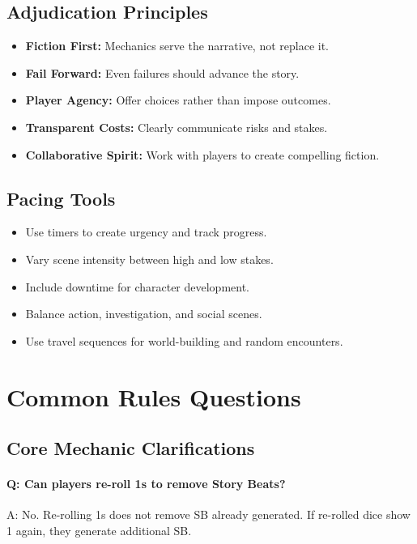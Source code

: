 \subsection{Adjudication Principles}\label{subsec:adjudication_ref}
\begin{itemize}
    \item \textbf{Fiction First:} Mechanics serve the narrative, not replace it.
    \item \textbf{Fail Forward:} Even failures should advance the story.
    \item \textbf{Player Agency:} Offer choices rather than impose outcomes.
    \item \textbf{Transparent Costs:} Clearly communicate risks and stakes.
    \item \textbf{Collaborative Spirit:} Work with players to create compelling fiction.
\end{itemize}

\subsection{Pacing Tools}\label{subsec:pacing_tools_ref}
\begin{itemize}
    \item Use timers to create urgency and track progress.
    \item Vary scene intensity between high and low stakes.
    \item Include downtime for character development.
    \item Balance action, investigation, and social scenes.
    \item Use travel sequences for world-building and random encounters.
\end{itemize}

\newpage
\section{Common Rules Questions}\label{sec:rules_questions}

\subsection{Core Mechanic Clarifications}\label{subsec:core_clarifications}
\paragraph{Q: Can players re-roll 1s to remove Story Beats?}
A: No. Re-rolling 1s does not remove SB already generated. If re-rolled dice show 1 again, they generate additional SB.

